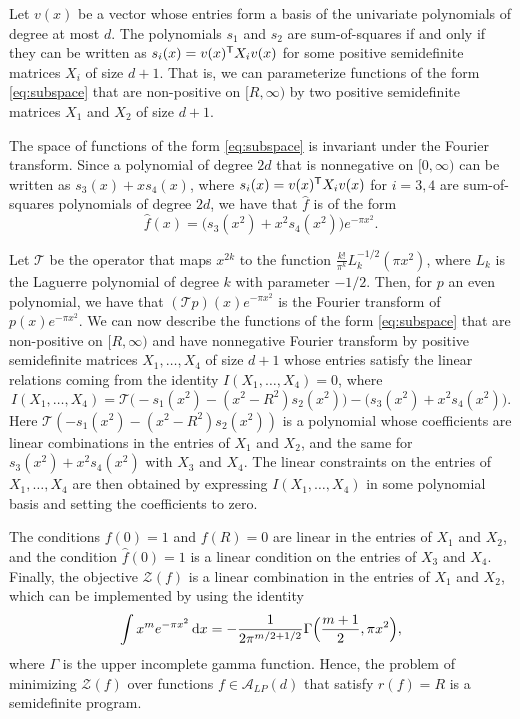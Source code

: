 \documentclass[reqno]{amsart}
\newcommand{\A}{\mathcal{A}}
\newcommand{\Z}{\mathcal{Z}}
\newcommand{\ft}{\widehat}
\renewcommand{\d}{\,\text{\rm d}}
\begin{document}
Let $v(x)$ be a vector whose entries form a basis of the univariate polynomials of degree at most $d$. The polynomials $s_1$ and $s_2$ are sum-of-squares if and only if they can be written as $s_i(x) = v(x)^{\sf T} X_i v(x)$ for some positive semidefinite matrices $X_i$ of size $d+1$. That is, we can parameterize functions of the form \eqref{eq:subspace} that are non-positive on $[R,\infty)$ by two positive semidefinite  matrices $X_1$ and $X_2$ of size $d+1$. 

The space of functions of the form \eqref{eq:subspace} is invariant under the Fourier transform. Since a polynomial of degree $2d$ that is nonnegative on $[0,\infty)$ can be written as $s_3(x) + x s_4(x)$, where $s_i(x) = v(x)^{\sf T} X_i v(x)$ for $i=3,4$ are sum-of-squares polynomials of degree $2d$, we have that $\widehat f$ is of the form
\[
\ft{f}(x) = \big(s_3(x^2) + x^2 s_4(x^2)\big)  e^{-\pi x^2}.
\]

Let $\mathcal T$ be the operator that maps $x^{2k}$ to the function $\frac{k!}{\pi^k} L_k^{-1/2}(\pi x^2)$,
where $L_k$ is the Laguerre polynomial of degree $k$ with parameter $-1/2$. Then, for $p$ an even polynomial, we have that $(\mathcal Tp)(x) e^{-\pi x^2}$ is the Fourier transform of $p(x) e^{-\pi x^2}$. We can now describe the functions of the form \eqref{eq:subspace} that are non-positive on $[R,\infty)$ and have nonnegative Fourier transform by positive semidefinite matrices $X_1,\ldots,X_4$ of size $d+1$ whose entries satisfy the linear relations coming from the identity $I(X_1,\ldots,X_4) = 0$, where
\begin{equation*}
I(X_1,\ldots,X_4) = \mathcal T\big(-s_1(x^2) - (x^2-R^2) s_2(x^2)\big) - \big(s_3(x^2) + x^2 s_4(x^2)\big).
\end{equation*}
Here $\mathcal T(-s_1(x^2) - (x^2-R^2) s_2(x^2))$ is a polynomial whose coefficients are linear combinations in the entries of $X_1$ and $X_2$, and the same for $s_3(x^2) + x^2 s_4(x^2)$ with $X_3$ and $X_4$. The linear constraints on the entries of $X_1,\ldots,X_4$ are then obtained by expressing $I(X_1,\ldots,X_4)$ in some polynomial basis and setting the coefficients to zero.

The conditions $f(0) = 1$ and $f(R) = 0$ are linear in the entries of $X_1$ and $X_2$, and the condition $\ft f(0)=1$ is a linear condition on the entries of $X_3$ and $X_4$.
Finally, the objective $\Z(f)$ is a linear combination in the entries of $X_1$ and $X_2$, which can be implemented by using the identity
\begin{equation}\label{eq:iidentity}
\int x^m e^{-\pi x^2} \d x = -\frac{1}{2\pi^{m/2+1/2}} \Gamma\Big(\frac{m+1}{2}, \pi x^2\Big),
\end{equation}
where $\Gamma$ is the upper incomplete gamma function. Hence, the problem of minimizing $\Z(f)$ over functions $f \in \A_{LP}(d)$ that satisfy $r(f) = R$ is a semidefinite program.
\end{document}
